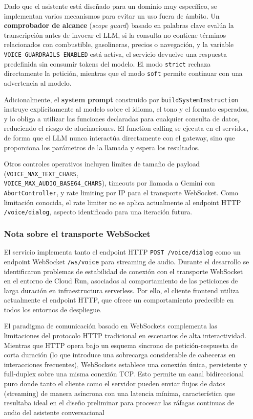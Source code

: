 Dado que el asistente está diseñado para un dominio muy específico, se implementan varios
mecanismos para evitar un uso fuera de ámbito. Un \textbf{comprobador de alcance}
(\textit{scope guard}) basado en palabras clave evalúa la transcripción antes de invocar
el LLM, si la consulta no contiene términos relacionados con combustible, gasolineras,
precios o navegación, y la variable \texttt{VOICE\_GUARDRAILS\_ENABLED} está activa, el
servicio devuelve una respuesta predefinida sin consumir tokens del modelo. El modo
\texttt{strict} rechaza directamente la petición, mientras que el modo \texttt{soft} permite continuar
con una advertencia al modelo.

Adicionalmente, el \textbf{system prompt} construido por \texttt{buildSystemInstruction}
instruye explícitamente al modelo sobre el idioma, el tono y el formato esperados, y lo
obliga a utilizar las funciones declaradas para cualquier consulta de datos, reduciendo el
riesgo de alucinaciones. El function calling se ejecuta en el servidor, de forma que el
LLM nunca interactúa directamente con el gateway, sino que proporciona los parámetros de
la llamada y espera los resultados.

Otros controles operativos incluyen límites de tamaño de payload
(\texttt{VOICE\_MAX\_TEXT\_CHARS}, \\ \texttt{VOICE\_MAX\_AUDIO\_BASE64\_CHARS}), timeouts
por llamada a Gemini con \texttt{AbortController}, y rate limiting por IP para el
transporte WebSocket. Como limitación conocida, el rate limiter no se aplica actualmente
al endpoint HTTP \texttt{/voice/dialog}, aspecto identificado para una iteración futura.

\subsubsection*{Nota sobre el transporte WebSocket}

El servicio implementa tanto el endpoint HTTP \texttt{POST /voice/dialog} como un
endpoint WebSocket \texttt{/ws/voice} para streaming de audio. Durante el desarrollo se
identificaron problemas de estabilidad de conexión con el transporte WebSocket en el
entorno de Cloud Run, asociados al comportamiento de las peticiones de larga duración en
infraestructura serverless. Por ello, el cliente frontend utiliza actualmente el endpoint
HTTP, que ofrece un comportamiento predecible en todos los entornos de despliegue.

El paradigma de comunicación basado en WebSockets complementa las limitaciones
del protocolo HTTP tradicional en escenarios de alta interactividad. Mientras que HTTP opera
bajo un esquema síncrono de petición-respuesta de corta duración (lo que introduce una sobrecarga
considerable de cabeceras en interacciones frecuentes), WebSockets establece una conexión única,
persistente y full-duplex sobre una misma conexión TCP. Esto permite un canal bidireccional puro donde
tanto el cliente como el servidor pueden enviar flujos de datos (streaming) de manera asíncrona con
una latencia mínima, característica que resultaba ideal en el diseño preliminar para procesar las
ráfagas continuas de audio del asistente conversacional

